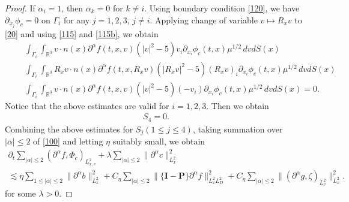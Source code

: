 \documentclass[reqno,a4paper]{amsart}
\numberwithin{equation}{section}
\newcommand{\1}{\mathbf{1}}
\newcommand{\R}{\mathbb{R}}
\renewcommand{\P}{\mathbf{P}}
\newcommand{\pa}{\partial}
\newcommand{\<}{\langle}
\renewcommand{\>}{\rangle}
\newcommand{\I}{\mathbf{I}}
\renewcommand{\P}{\mathbf{P}}
\begin{document}
\begin{proof}
If $\alpha_i = 1$, then $\alpha_k=0$ for $k\neq i$. Using boundary condition \eqref{120}, we have $\partial_{x_j}\phi_c=0$ on $\Gamma_i$ for any $j=1,2,3$, $j\neq i$. Applying change of variable $v\mapsto R_xv$ to \eqref{20} and using \eqref{115} and \eqref{115b}, we obtain 
		\begin{align*}
		&\quad\,\int_{\Gamma_i}\int_{\R^3}v\cdot n(x){\partial^\alpha f}(t,x,v)(|v|^2-5)v_i\pa_{x_i}\phi_c(t,x)\mu^{1/2}\,dvdS(x)\\
		&\quad\,\int_{\Gamma_i}\int_{\R^3}R_xv\cdot n(x){\partial^\alpha f}(t,x,R_xv)(|R_xv|^2-5)(R_xv)_i\pa_{x_i}\phi_c(t,x)\mu^{1/2}\,dvdS(x)\\
		&\quad\,\int_{\Gamma_i}\int_{\R^3}v\cdot n(x){\partial^\alpha f}(t,x,v)(|v|^2-5)(-v_i)\pa_{x_i}\phi_c(t,x)\mu^{1/2}\,dvdS(x) = 0. 
	\end{align*}
Notice that the above estimates are valid for $i=1,2,3$. Then we obtain 
\begin{align*}
	S_4= 0. 
\end{align*}
Combining the above estimates for $S_j$$(1\le j\le 4)$, taking summation over $|\alpha|\le 2$ of \eqref{100} and letting $\eta$ suitably small, we obtain
\begin{multline}\label{122a}
	\partial_t\sum_{|\alpha|\le 2}(\partial^\alpha f,\Phi_c)_{L^2_{x,v}} + \lambda\sum_{|\alpha|\le 2}\|{\partial^\alpha c}\|^2_{L^2_{x}} \\
	\lesssim \eta \sum_{1\le|\alpha|\le2}\|{\partial^\alpha b}\|^2_{L^2_{x}}
	+C_\eta\sum_{|\alpha|\le 2}\|\{\I-\P\}{\partial^\alpha f}\|^2_{L^2_{x}L^2_D} 
	+C_\eta\sum_{|\alpha|\le 2}\|({\partial^\alpha g},\zeta)_{L^2_v}\|^2_{L^2_{x}}.
\end{multline}for some $\lambda>0$. 


\end{proof}
\end{document}
